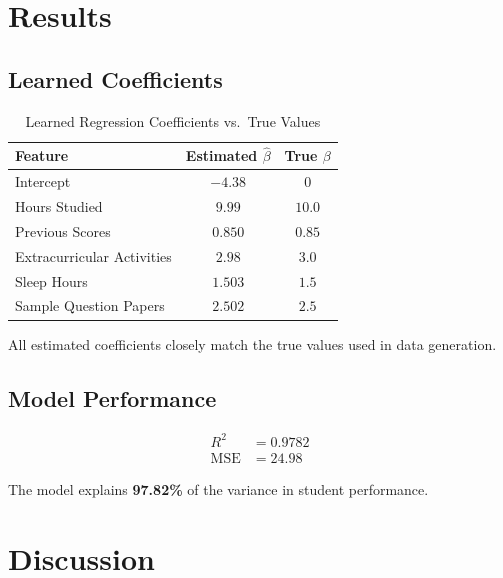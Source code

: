 \documentclass[12pt,a4paper]{article}
\begin{document}
\section{Results}

\subsection{Learned Coefficients}

\begin{table}[H]
\centering
\caption{Learned Regression Coefficients vs.\ True Values}
\begin{tabular}{l cc}
\toprule
\textbf{Feature} & \textbf{Estimated $\hat{\beta}$} & \textbf{True $\beta$} \\ \midrule
Intercept               & $-4.38$ & $0$ \\
Hours Studied           & $9.99$  & $10.0$ \\
Previous Scores         & $0.850$ & $0.85$ \\
Extracurricular Activities & $2.98$ & $3.0$ \\
Sleep Hours             & $1.503$ & $1.5$ \\
Sample Question Papers  & $2.502$ & $2.5$ \\
\bottomrule
\end{tabular}
\end{table}

All estimated coefficients closely match the true values used in data generation.

\subsection{Model Performance}

\begin{align*}
  R^2 &= 0.9782 \\
  \text{MSE} &= 24.98
\end{align*}

The model explains \textbf{97.82\%} of the variance in student performance.

\section{Discussion}
\end{document}
